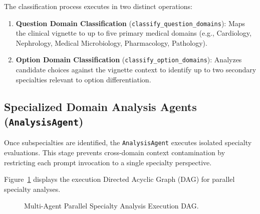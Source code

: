 The classification process executes in two distinct operations:
\begin{enumerate}
    \item \textbf{Question Domain Classification} (\texttt{classify\_question\_domains}): Maps the clinical vignette to up to five primary medical domains (e.g., Cardiology, Nephrology, Medical Microbiology, Pharmacology, Pathology).
    \item \textbf{Option Domain Classification} (\texttt{classify\_option\_domains}): Analyzes candidate choices against the vignette context to identify up to two secondary specialties relevant to option differentiation.
\end{enumerate}

\subsection{Specialized Domain Analysis Agents (\texttt{AnalysisAgent})}

Once subspecialties are identified, the \texttt{AnalysisAgent} executes isolated specialty evaluations. This stage prevents cross-domain context contamination by restricting each prompt invocation to a single specialty perspective.

Figure~\ref{fig:parallel_dag} displays the execution Directed Acyclic Graph (DAG) for parallel specialty analyses.

\begin{figure}[htbp]
\centering
{}
\caption{Multi-Agent Parallel Specialty Analysis Execution DAG.}
\label{fig:parallel_dag}
\end{figure}


